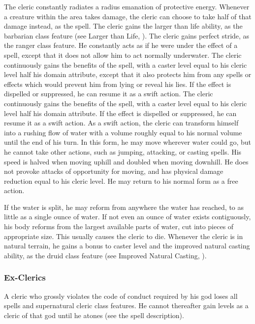  The cleric constantly radiates a \areamed radius emanation of protective energy. Whenever a creature within the area takes damage, the cleric can choose to take half of that damage instead, as the  spell.
 The cleric gains the larger than life ability, as the barbarian class feature (see Larger than Life, ).
 The cleric gains perfect stride, as the ranger class feature. He constantly acts as if he were under the effect of a  spell, except that it does not allow him to act normally underwater.
 The cleric continuously gains the benefits of the  spell, with a caster level equal to his cleric level \add half his domain attribute, except that it also protects him from any spells or effects which would prevent him from lying or reveal his lies. If the effect is dispelled or suppressed, he can resume it as a swift action.
 The cleric continuously gains the benefits of the  spell, with a caster level equal to his cleric level \add half his domain attribute. If the effect is dispelled or suppressed, he can resume it as a swift action.
 As a swift action, the cleric can transform himself into a rushing flow of water with a volume roughly equal to his normal volume until the end of his turn. In this form, he may move wherever water could go, but he cannot take other actions, such as jumping, attacking, or casting spells. His speed is halved when moving uphill and doubled when moving downhill. He does not provoke attacks of opportunity for moving, and has physical damage reduction equal to his cleric level. He may return to his normal form as a free action.
\par If the water is split, he may reform from anywhere the water has reached, to as little as a single ounce of water. If not even an ounce of water exists contiguously, his body reforms from the largest available parts of water, cut into pieces of appropriate size. This usually causes the cleric to die.
 Whenever the cleric is in natural terrain, he gains a  bonus to caster level and the improved natural casting ability, as the druid class feature (see Improved Natural Casting, ).

\subsubsection{Ex-Clerics}
A cleric who grossly violates the code of conduct required by his god loses all spells and supernatural cleric class features. He cannot thereafter gain levels as a cleric of that god until he atones (see the  spell description).

